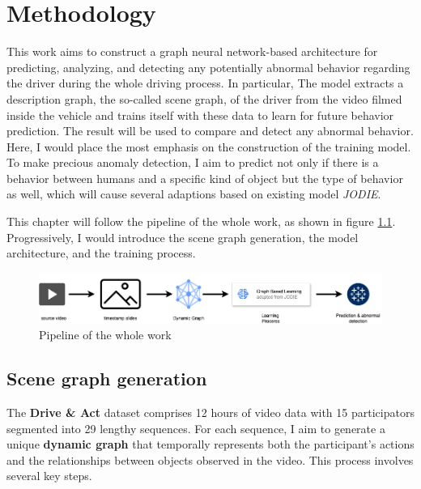 \chapter{Methodology}\label{chapter:methodology}



This work aims to construct a graph neural network-based architecture for predicting, analyzing, and detecting any potentially abnormal behavior regarding the driver during the whole driving process. In particular, The model extracts a description graph, the so-called scene graph, of the driver from the video filmed inside the vehicle and trains itself with these data to learn for future behavior prediction. The result will be used to compare and detect any abnormal behavior. Here, I would place the most emphasis on the construction of the training model. To make precious anomaly detection, I aim to predict not only if there is a behavior between humans and a specific kind of object but the type of behavior as well, which will cause several adaptions based on existing model \textit{JODIE}. 

This chapter will follow the pipeline of the whole work, as shown in figure \ref{fig:pipeline}. Progressively, I would introduce the scene graph generation, the model architecture, and the training process. 

\begin{figure}
    \centering
    \includegraphics[width=\linewidth]{figures/04_pipeline.png}
    \caption{Pipeline of the whole work}
    \label{fig:pipeline}
\end{figure}


\section{Scene graph generation}

The \textbf{Drive \& Act} dataset comprises 12 hours of video data with 15 participators segmented into 29 lengthy sequences. For each sequence, I aim to generate a unique \textbf{dynamic graph} that temporally represents both the participant's actions and the relationships between objects observed in the video. This process involves several key steps.


